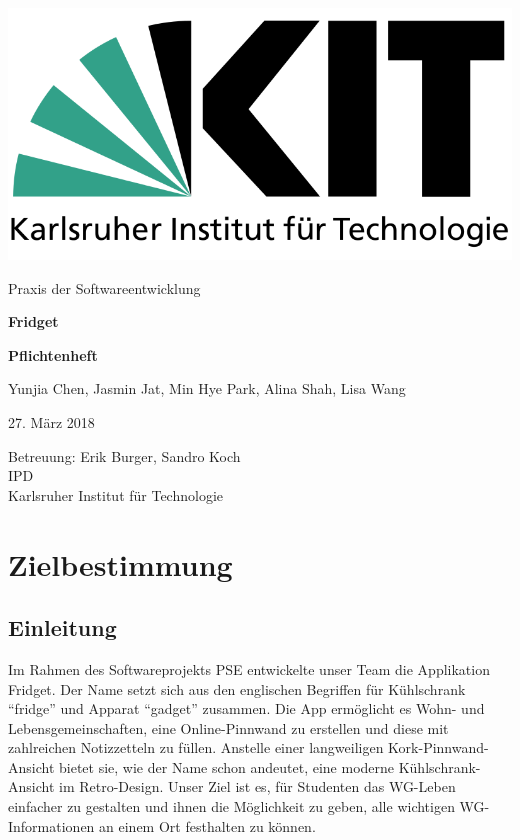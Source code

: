 \documentclass[a4paper]{scrreprt}
\begin{document}
    \begin{flushright}
        \includegraphics[scale = 0.2]{kit-logo.png}\\[0.5cm]
    \end{flushright}
    \vspace*{2cm}

    \begin{center} 
    		\large Praxis der Softwareentwicklung
        \vspace*{1.5cm}

        \textbf{\huge Fridget}
        \vspace*{1cm}

        \textbf{\Large Pflichtenheft}
        \vspace*{2cm}

        Yunjia Chen, Jasmin Jat, Min Hye Park, Alina Shah, Lisa Wang
        \vspace*{1cm}

        27. März 2018
        \vspace*{2.5cm}

        Betreuung: Erik Burger, Sandro Koch\\[0.5cm]
        IPD\\[0.5cm]

        Karlsruher Institut für Technologie
    \end{center}
    \thispagestyle{empty}

    \tableofcontents

    \chapter{Zielbestimmung}
    
    	\section{Einleitung}
    	Im Rahmen des Softwareprojekts PSE entwickelte unser Team die Applikation Fridget. Der Name setzt sich aus den englischen Begriffen für Kühlschrank “fridge” und Apparat “gadget” zusammen. Die App ermöglicht es Wohn- und Lebensgemeinschaften, eine Online-Pinnwand zu erstellen und diese mit zahlreichen Notizzetteln zu füllen. Anstelle einer langweiligen Kork-Pinnwand-Ansicht bietet sie, wie der Name schon andeutet, eine moderne Kühlschrank-Ansicht im Retro-Design.
    	Unser Ziel ist es, für Studenten das WG-Leben einfacher zu gestalten und ihnen die Möglichkeit zu geben, alle wichtigen WG-Informationen an einem Ort festhalten zu können.
    	
\end{document}
